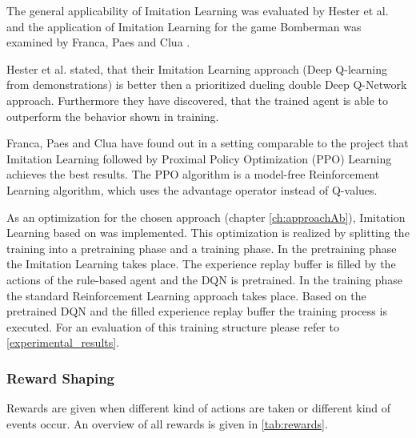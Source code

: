 The general applicability of Imitation Learning was evaluated by Hester et al. \cite{hester2017deep} and the application of Imitation Learning for the game Bomberman was examined by Franca, Paes and Clua \cite{Franca2019}.

Hester et al. \cite{hester2017deep} stated, that their Imitation Learning approach (Deep Q-learning from demonstrations) is better then a prioritized dueling double Deep Q-Network approach. Furthermore they have discovered, that the trained agent is able to outperform the behavior shown in training.

Franca, Paes and Clua \cite{Franca2019} have found out in a setting comparable to the project that Imitation Learning followed by Proximal Policy Optimization (PPO) Learning achieves the best results. The PPO algorithm is a model-free Reinforcement Learning algorithm, which uses the advantage operator instead of Q-values.

As an optimization for the chosen approach (chapter \ref{ch:approachAb}), Imitation Learning based on \cite{hester2017deep} was implemented. This optimization is realized by splitting the training into a pretraining phase and a training phase. In the pretraining phase the Imitation Learning takes place. The experience replay buffer is filled by the actions of the rule-based agent and the DQN is pretrained.
In the training phase the standard Reinforcement Learning approach takes place. Based on the pretrained DQN and the filled experience replay buffer the training process is executed. For an evaluation of this training structure please refer to \autoref{experimental_results}.

\subsubsection{Reward Shaping}
\label{ch:approachBd}

Rewards are given when different kind of actions are taken or different kind of events occur. An overview of all rewards is given in \autoref{tab:rewards}.

